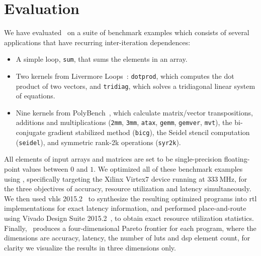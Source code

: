 \section{Evaluation}
\label{lo:sec:results}


We have evaluated \soap~on a suite of benchmark examples which consists of
several applications that have recurring inter-iteration dependences:
\begin{itemize}

\item A simple loop, \verb|sum|, that sums the elements in an array.

\item Two kernels from Livermore Loops~\cite{livermore}: \verb|dotprod|, which
computes the dot product of two vectors, and \verb|tridiag|, which solves a
tridiagonal linear system of equations.

\item Nine kernels from PolyBench~\cite{polybench}, which calculate
matrix/vector transpositions, additions and multiplications (\verb|2mm|,
\verb|3mm|, \verb|atax|, \verb|gemm|, \verb|gemver|, \verb|mvt|), the
bi-conjugate gradient stabilized method (\verb|bicg|), the Seidel stencil
computation (\verb|seidel|), and symmetric rank-2k operations
(\verb|syr2k|).

\end{itemize}

All elements of input arrays and matrices are set to be single-precision
floating-point values between $0$ and $1$.  We optimized all of these
benchmark examples using \soap, specifically targeting the Xilinx Virtex7
device running at $333~\mathrm{MHz}$, for the three objectives of accuracy,
resource utilization and latency simultaneously.  We then used \gls{vhls}
2015.2~\cite{vivado_hls} to synthesize the resulting optimized programs
into \gls{rtl} implementations for exact latency information, and performed
place-and-route using Vivado Design Suite 2015.2~\cite{vivado_ds}, to
obtain exact resource utilization statistics.  Finally, \soap~produces a
four-dimensional Pareto frontier for each program, where the dimensions are
accuracy, latency, the number of \glspl{lut} and \gls{dsp} element count, for
clarity we visualize the results in three dimensions only.

